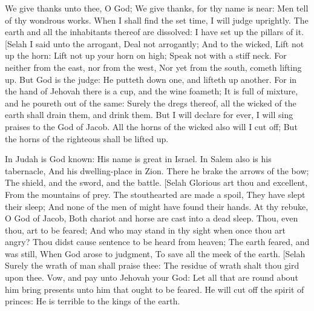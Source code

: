 We give thanks unto thee, O God; We give thanks, for thy name is near: Men tell of thy wondrous works.  When I shall find the set time, I will judge uprightly.  The earth and all the inhabitants thereof are dissolved: I have set up the pillars of it. [Selah  I said unto the arrogant, Deal not arrogantly; And to the wicked, Lift not up the horn:  Lift not up your horn on high; Speak not with a stiff neck.  For neither from the east, nor from the west, Nor yet from the south, cometh lifting up.  But God is the judge: He putteth down one, and lifteth up another.  For in the hand of Jehovah there is a cup, and the wine foameth; It is full of mixture, and he poureth out of the same: Surely the dregs thereof, all the wicked of the earth shall drain them, and drink them.  But I will declare for ever, I will sing praises to the God of Jacob.  All the horns of the wicked also will I cut off; But the horns of the righteous shall be lifted up. 

In Judah is God known: His name is great in Israel.  In Salem also is his tabernacle, And his dwelling-place in Zion.  There he brake the arrows of the bow; The shield, and the sword, and the battle. [Selah  Glorious art thou and excellent, From the mountains of prey.  The stouthearted are made a spoil, They have slept their sleep; And none of the men of might have found their hands.  At thy rebuke, O God of Jacob, Both chariot and horse are cast into a dead sleep.  Thou, even thou, art to be feared; And who may stand in thy sight when once thou art angry?  Thou didst cause sentence to be heard from heaven; The earth feared, and was still,  When God arose to judgment, To save all the meek of the earth. [Selah  Surely the wrath of man shall praise thee: The residue of wrath shalt thou gird upon thee.  Vow, and pay unto Jehovah your God: Let all that are round about him bring presents unto him that ought to be feared.  He will cut off the spirit of princes: He is terrible to the kings of the earth. 

